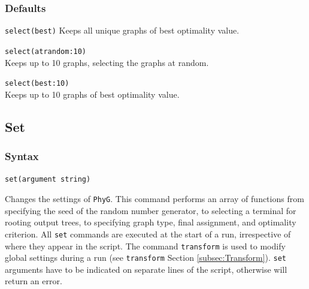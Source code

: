 	\subsubsection{Defaults}
		\texttt{select(best)} Keeps all unique graphs of best optimality value.
		
	\begin{example}
		\item{\texttt{select(atrandom:10)}\\ Keeps up to 10 graphs, selecting the graphs
		 at random.}
						
		\item{\texttt{select(best:10)}\\ Keeps up to 10 graphs of best optimality value.}
	\end{example}

\subsection{Set}
\label{subsec:set}
	\subsubsection{Syntax}
		\texttt{set(argument string)}
	
	\begin{phygdescription}
		{Changes the settings of \texttt{PhyG}. This command performs an array of functions
		from specifying the seed of the random number generator, to selecting a terminal for
		rooting output trees, to specifying  graph type, final assignment, and 	optimality 
		criterion. All \texttt{set} commands are executed at the start of a run, irrespective of
		where they appear in the script. The command \texttt{transform} is used to modify 
		global settings during a run (see \texttt{transform} Section \ref{subsec:Transform}).
		\texttt{set} arguments have to be indicated on separate lines of the script, otherwise
		\phyg will return an error.}
	\end{phygdescription}
			
